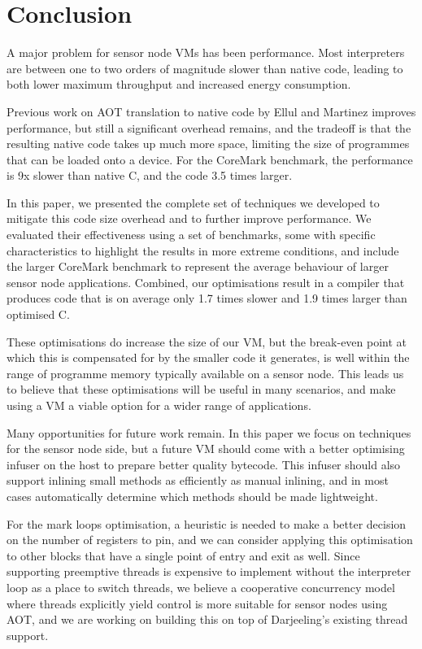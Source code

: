 \chapter{Conclusion}
A major problem for sensor node VMs has been performance. Most interpreters are between one to two orders of magnitude slower than native code, leading to both lower maximum throughput and increased energy consumption.

Previous work on AOT translation to native code by Ellul and Martinez \cite{Ellul:2010iw} improves performance, but still a significant overhead remains, and the tradeoff is that the resulting native code takes up much more space, limiting the size of programmes that can be loaded onto a device. For the CoreMark benchmark, the performance is 9x slower than native C, and the code 3.5 times larger.

In this paper, we presented the complete set of techniques we developed to mitigate this code size overhead and to further improve performance. We evaluated their effectiveness using a set of benchmarks, some with specific characteristics to highlight the results in more extreme conditions, and include the larger CoreMark benchmark to represent the average behaviour of larger sensor node applications. Combined, our optimisations result in a compiler that produces code that is on average only 1.7 times slower and 1.9 times larger than optimised C.

These optimisations do increase the size of our VM, but the break-even point at which this is compensated for by the smaller code it generates, is well within the range of programme memory typically available on a sensor node. This leads us to believe that these optimisations will be useful in many scenarios, and make using a VM a viable option for a wider range of applications.

Many opportunities for future work remain. In this paper we focus on techniques for the sensor node side, but a future VM should come with a better optimising infuser on the host to prepare better quality bytecode. This infuser should also support inlining small methods as efficiently as manual inlining, and in most cases automatically determine which methods should be made lightweight.

For the mark loops optimisation, a heuristic is needed to make a better decision on the number of registers to pin, and we can consider applying this optimisation to other blocks that have a single point of entry and exit as well. Since supporting preemptive threads is expensive to implement without the interpreter loop as a place to switch threads, we believe a cooperative concurrency model where threads explicitly yield control is more suitable for sensor nodes using AOT, and we are working on building this on top of Darjeeling's existing thread support.

